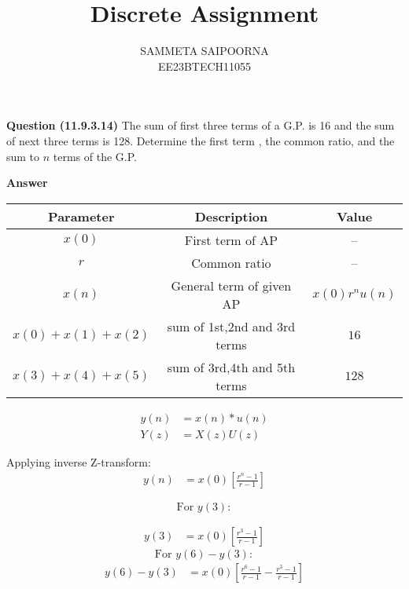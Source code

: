 \documentclass[journal,12pt,onecolumn]{IEEEtran}
\theoremstyle{remark}
\begin{document}
\let\vec\mathbf



\bigskip

\renewcommand{\thefigure}{\theenumi}
\renewcommand{\thetable}{\theenumi}

\title{Discrete Assignment}
\author{SAMMETA SAIPOORNA\\ EE23BTECH11055}
\maketitle
\textbf{Question (11.9.3.14)}
The sum of first three terms of a G.P. is 16 and the sum of next three terms is 128. Determine the first term , the common ratio, and the sum to $n$ terms of the G.P.


\textbf{Answer}


\begin{tabular}{|c|c|c|}
      \hline
      Parameter & Description & Value\\\hline
      $x(0)$ & First term of AP & --\\\hline
      $r$ & Common ratio & --\\\hline
      $x(n)$ & General term of given AP & $x(0)r^nu(n)$\\\hline
      $x(0)+x(1)+x(2)$ & sum of 1st,2nd and 3rd terms & $16$\\\hline
      $x(3)+x(4)+x(5)$ & sum of 3rd,4th and 5th terms & $128$\\\hline
\end{tabular}

\begin{align}
y(n) &= x(n) * u(n) \label{eq:1} \\
Y(z) &= X(z) U(z) \label{eq:2}
\end{align}

Applying inverse Z-transform:
\begin{align}
y(n) &= x(0) \left[ \frac{r^n - 1}{r - 1} \right] \label{eq:3}
\end{align}

$$
\text{For } y(3):
$$

\begin{align}
y(3) &= x(0) \left[ \frac{r^3 - 1}{r - 1} \right] \label{eq:4}
\end{align}
$$
\text{For } y(6) - y(3):
$$
\begin{align}
y(6) - y(3) &= x(0) \left[ \frac{r^6 - 1}{r - 1} - \frac{r^3 - 1}{r - 1} \right] \label{eq:5}
\end{align}
\end{document}
